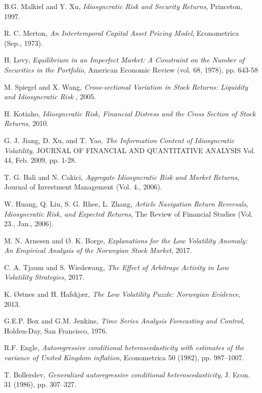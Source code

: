 \begin{thebibliography}{9}
B.G. Malkiel and Y. Xu, \textit{Idiosyncratic Risk and Security Returns}, Princeton, 1997.

R. C. Merton, \textit{An Intertemporal Capital Asset Pricing Model}, Econometrica (Sep., 1973).

H. Levy, \textit{Equilibrium in an Imperfect Market: A Constraint on the Number of Securities in the Portfolio}, American Economic Review (vol. 68, 1978), pp. 643-58

M. Spiegel and X. Wang, \textit{Cross-sectional Variation in Stock Returns:
Liquidity and Idiosyncratic Risk }, 2005.

H. Kotiaho, \textit{Idiosyncratic Risk, Financial Distress
and the Cross Section of Stock Returns}, 2010.

G. J. Jiang, D. Xu, and T. Yao, \textit{The Information Content of Idiosyncratic Volatility}, JOURNAL OF FINANCIAL AND QUANTITATIVE ANALYSIS Vol. 44, Feb. 2009, pp. 1-28.

T. G. Bali and N. Cakici, \textit{Aggregate Idiosyncratic Risk and Market Returns}, Journal of Investment Management (Vol. 4., 2006).

W. Huang, Q. Liu, S. G. Rhee, L. Zhang, \textit{Article Navigation
Return Reversals, Idiosyncratic Risk, and Expected Returns}, The Review of Financial Studies (Vol. 23., Jan., 2006).

M. N. Arnesen and Ø. K. Borge, \textit{Explanations for the Low Volatility Anomaly: An Empirical Analysis of the Norwegian Stock Market}, 2017.

C. A. Tjaum and S. Wiedswang, \textit{The Effect of Arbitrage Activity in
Low Volatility Strategies}, 2017.

K. Østnes and H. Hafskjær, \textit{The Low Volatility Puzzle:
Norwegian Evidence}, 2013.


G.E.P. Box and G.M. Jenkins, \textit{Time Series Analysis Forecasting and Control}, Holden-Day, San Francisco, 1976.

R.F. Engle, \textit{Autoregressive conditional heteroscedasticity with estimates of the variance of United Kingdom inflation}, Econometrica 50 (1982), pp. 987–1007.

T. Bollerslev, \textit{Generalized autoregressive conditional heteroscedasticity}, J. Econ. 31 (1986), pp. 307–327.


\end{thebibliography}
